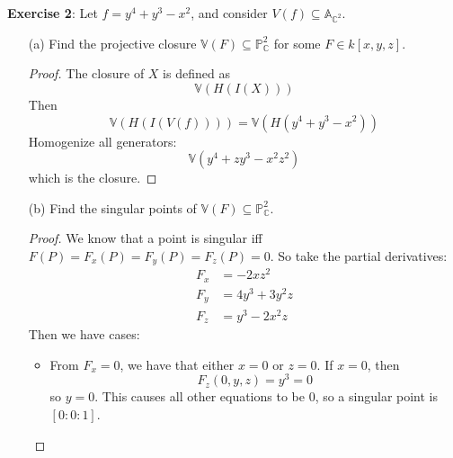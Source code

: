 \documentclass{article}
\begin{document}
\textbf{Exercise 2}: Let $f = y^{4} + y^{3} - x^{2}$, and consider $V(f) \subseteq\mathbb{A}_{\mathbb{C}^{2}}$.
    \begin{itemize}
        \item [(a)] Find the projective closure $\mathbb{V}(F) \subseteq\mathbb{P}^{2}_{\mathbb{C}}$ for some $F \in k[x, y, z]$.
            \begin{proof}
                The closure of $X$ is defined as 
                    \begin{equation*}
                        \mathbb{V}(H(I(X)))
                    \end{equation*}
                Then
                    \begin{equation*}
                        \mathbb{V}(H(I(V(f)))) = \mathbb{V}(H(y^{4} + y^{3} - x^{2}))
                    \end{equation*}
                Homogenize all generators:
                    \begin{equation*}
                        \mathbb{V}(y^{4} + zy^{3} -x^{2}z^{2})
                    \end{equation*}
                which is the closure.
            \end{proof}

        \item [(b)] Find the singular points of $\mathbb{V}(F) \subseteq \mathbb{P}_{\mathbb{C}}^{2}$.
            \begin{proof}
                We know that a point is singular iff $F(P) = F_{x}(P) = F_{y}(P) = F_{z}(P) = 0$. So take the partial derivatives:
                    \begin{align*}
                        F_{x} &= -2xz^{2}         \\
                        F_{y} &= 4y^{3} + 3y^{2}z \\
                        F_{z} &= y^{3} - 2x^{2}z    
                    \end{align*}
                Then we have cases:
                    \begin{itemize}
                        \item From $F_{x} = 0$, we have that either $x = 0$ or $z = 0$. If $x = 0$, then
                            \begin{equation*}
                                F_{z}(0, y, z) = y^{3} = 0
                            \end{equation*}
                        so $y = 0$. This causes all other equations to be $0$, so a singular point is $[0 : 0 : 1]$.


\end{itemize}
\end{proof}
\end{itemize}
\end{document}
